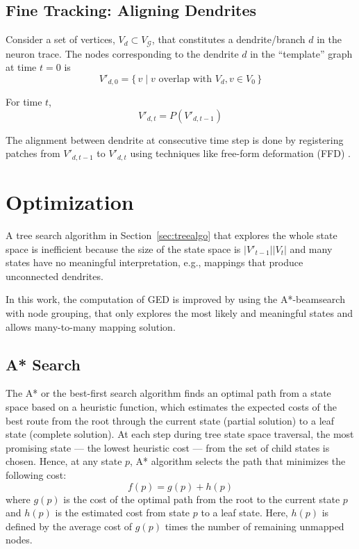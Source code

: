 \documentclass{article}
\begin{document}
\subsection{Fine Tracking: Aligning Dendrites}
Consider a set of vertices, $V_d \subset V_\mathcal{G}$, that constitutes a dendrite/branch $d$ in the neuron trace. The nodes corresponding to the dendrite $d$ in the ``template'' graph at time $t = 0$ is
\begin{equation}
V'_{d,0} = \{\,v \mid v \text{ overlap with } V_d, v \in V_0 \,\}
\end{equation}

For time $t$,
\begin{equation}
V'_{d,t} = P( V'_{d,t-1})
\end{equation}

The alignment between dendrite at consecutive time step is done by registering patches from $V'_{d,t-1}$ to $V'_{d,t}$ using techniques like free-form deformation (FFD) \cite{Rueckert1999}.


\section{Optimization}
A tree search algorithm in Section~\ref{sec:treealgo} that explores the whole state space is inefficient because the size of the state space is $|V'_{t-1}||V_t|$ and many states have no meaningful interpretation, e.g., mappings that produce unconnected dendrites. 

In this work, the computation of GED is improved by using the A*-beamsearch \cite{neuhaus2006} with node grouping, that only explores the most likely and meaningful states and allows many-to-many mapping solution.

\subsection{A* Search}
The A* or the best-first search algorithm \cite{hart1968} finds an optimal path from a state space based on a heuristic function, which estimates the expected costs of the best route from the root through the current state (partial solution) to a leaf state (complete solution). At each step during tree state space traversal, the most promising state --- the lowest heuristic cost --- from the set of child states is chosen. Hence, at any state $p$, A* algorithm selects the path that minimizes the following cost:
\begin{equation} \label{eq:a*}
f(p) = g(p) + h(p)
\end{equation}
where $g(p)$ is the cost of the optimal path from the root to the current state $p$ and $h(p)$ is the estimated cost from state $p$ to a leaf state. Here, $h(p)$ is defined by the average cost of $g(p)$ times the number of remaining unmapped nodes.
\end{document}
